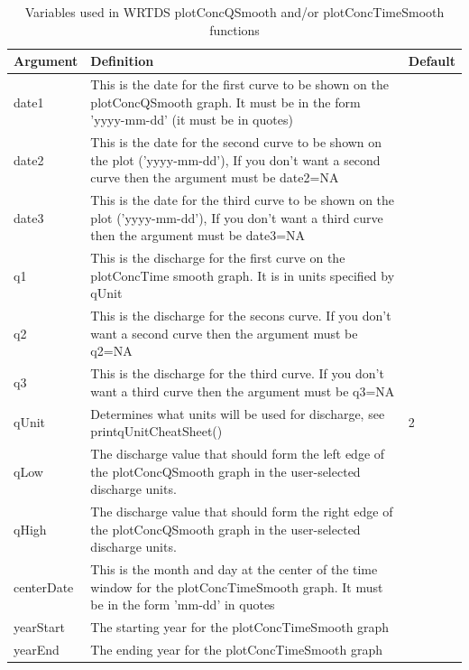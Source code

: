 \documentclass[a4paper,11pt]{article}\usepackage[]{graphicx}\usepackage[]{color}
\begin{document}
\begin{table}[ht]
\caption{Variables used in WRTDS plotConcQSmooth and/or plotConcTimeSmooth functions \label{tab:wrtdsMultiVariables}}
\begin{tabularx}{\textwidth}{lXl}
\hline
  \textbf{Argument} & \textbf{Definition} & \textbf{Default}\\
\hline
date1 & This is the date for the first curve to be shown on the plotConcQSmooth graph.  It must be in the form 'yyyy-mm-dd' (it must be in quotes) &\\
date2 & This is the date for the second curve to be shown on the plot ('yyyy-mm-dd'), If you don't want a second curve then the argument must be date2=NA &\\
date3 & This is the date for the third curve to be shown on the plot ('yyyy-mm-dd'), If you don't want a third curve then the argument must be date3=NA &\\
q1 & This is the discharge for the first curve on the plotConcTime smooth graph. It is in units specified by qUnit &\\
q2 & This is the discharge for the secons curve. If you don't want a second curve then the argument must be q2=NA &\\
q3 & This is the discharge for the third curve. If you don't want a third curve then the argument must be q3=NA &\\
qUnit & Determines what units will be used for discharge, see printqUnitCheatSheet() & 2\\
qLow & The discharge value that should form the left edge of the plotConcQSmooth graph in the user-selected discharge units. & \\
qHigh & The discharge value that should form the right edge of the plotConcQSmooth graph in the user-selected discharge units. & \\
centerDate & This is the month and day at the center of the time window for the plotConcTimeSmooth graph. It must be in the form 'mm-dd' in quotes &\\
yearStart & The starting year for the plotConcTimeSmooth graph &\\
yearEnd & The ending year for the plotConcTimeSmooth graph &\\


\end{tabularx}
\end{table}
\end{document}
